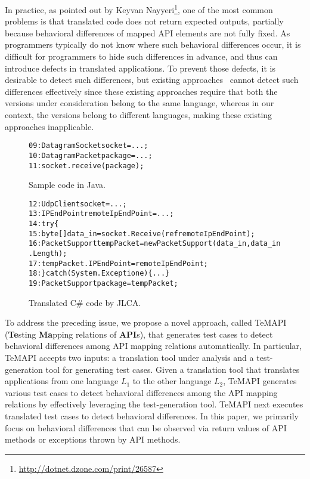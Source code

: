 In practice, as pointed out by Keyvan Nayyeri\footnote{\url{http://dotnet.dzone.com/print/26587}}, one of the most common problems is that translated code does not return expected outputs, partially because behavioral differences of mapped API elements are not fully fixed. As programmers typically do not know where such behavioral differences occur, it is difficult for programmers to hide such differences in advance, and thus can introduce defects in translated applications. To prevent those defects, it is desirable to detect such differences, but existing approaches~\cite{orso1using,jin2010automated} cannot detect such differences effectively since these existing approaches require that both the versions under consideration belong to the same language, whereas in our context, the versions belong to different languages, making these existing approaches inapplicable.
\begin{figure}[t]
\begin{CodeOut}%
\begin{alltt}
09: DatagramSocket socket = ...;
10: DatagramPacket package = ...;
11: socket.receive(package);
\end{alltt}
\end{CodeOut}\vspace*{-5ex}
\caption{Sample code in Java.}%
\label{fig:javacode}
\begin{CodeOut}%
\begin{alltt}
12: UdpClient socket = ...;
13: IPEndPoint remoteIpEndPoint = ...;
14: try\{
15:  byte[] data_in = socket.Receive(ref remoteIpEndPoint);
16:  PacketSupport tempPacket = new PacketSupport(data_in, data_in.Length);
17:   tempPacket.IPEndPoint = remoteIpEndPoint;
18: \} catch (System.Exception e)\{...\}
19: PacketSupport package = tempPacket;
\end{alltt}
\end{CodeOut}\vspace*{-5ex}
\caption{Translated C\# code by JLCA.}\vspace*{-4ex}
\label{fig:codeJLCA}
\end{figure}

To address the preceding issue, we propose a novel approach, called TeMAPI (\textbf{Te}sting \textbf{Ma}pping relations of \textbf{API}s), that generates test cases to detect behavioral differences among API mapping relations automatically. In particular, TeMAPI accepts two inputs: a translation tool under analysis and a test-generation tool for generating test cases. Given a translation tool that translates applications from one language $L_1$ to the other language $L_2$, TeMAPI generates various test cases to detect behavioral differences among the API mapping relations by effectively leveraging the test-generation tool. TeMAPI next executes translated test cases to detect behavioral differences. In this paper, we primarily focus on
behavioral differences that can be observed via return values of API methods or exceptions thrown by API methods.

